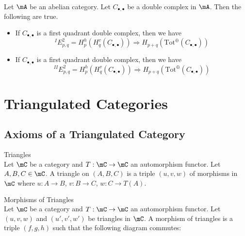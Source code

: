 \documentclass[a4paper]{article}
\begin{document}
\begin{prp}{}{}\\
Let $\mA$ be an abelian category. Let $C_{\bullet,\bullet}$ be a double complex in $\mA$. Then the following are true. 
\begin{itemize}
\item If $C_{\bullet,\bullet}$ is a first quadrant double complex, then we have $${^I}E_{p,q}^2=H_p^h(H_q^v(C_{\bullet,\bullet}))\Rightarrow H_{p+q}(\text{Tot}^\oplus(C_{\bullet,\bullet}))$$
\item If $C_{\bullet,\bullet}$ is a first quadrant double complex, then we have $${^{II}}E_{p,q}^2=H_p^h(H_q^v(C_{\bullet,\bullet}))\Rightarrow H_{p+q}(\text{Tot}^\oplus(C_{\bullet,\bullet}))$$
\end{itemize}
\end{prp}

\pagebreak
\section{Triangulated Categories}
\subsection{Axioms of a Triangulated Category}
\begin{defn}{Triangles}{}\\
Let $\mC$ be a category and $T:\mC\to\mC$ an automorphism functor. Let $A,B,C\in\mC$. A triangle on $(A,B,C)$ is a triple $(u,v,w)$ of morphisms in $\mC$ where $u:A\to B$, $v:B\to C$, $w:C\to T(A)$. 
\end{defn}

\begin{defn}{Morphisms of Triangles}{}\\
Let $\mC$ be a category and $T:\mC\to\mC$ an automorphism functor. Let $(u,v,w)$ and $(u',v',w')$ be triangles in $\mC$. A morphism of triangles is a triple $(f,g,h)$ such that the following diagram commutes: \\~\\
\\~\\
\end{defn}
\end{document}
